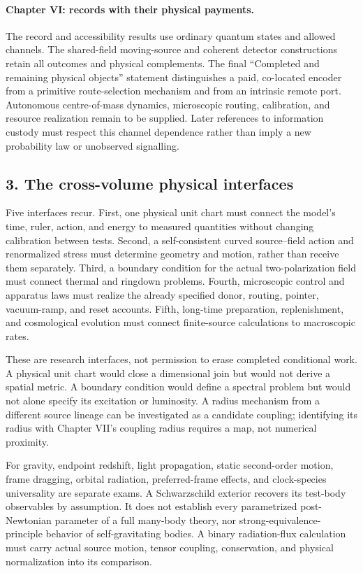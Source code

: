 \paragraph{Chapter VI: records with their physical payments.}
The record and accessibility results use ordinary quantum states and allowed channels. The shared-field moving-source and coherent detector constructions retain all outcomes and physical complements. The final ``Completed and remaining physical objects'' statement distinguishes a paid, co-located encoder from a primitive route-selection mechanism and from an intrinsic remote port. Autonomous centre-of-mass dynamics, microscopic routing, calibration, and resource realization remain to be supplied. Later references to information custody must respect this channel dependence rather than imply a new probability law or unobserved signalling.

\subsection*{3. The cross-volume physical interfaces}

Five interfaces recur. First, one physical unit chart must connect the model's time, ruler, action, and energy to measured quantities without changing calibration between tests. Second, a self-consistent curved source--field action and renormalized stress must determine geometry and motion, rather than receive them separately. Third, a boundary condition for the actual two-polarization field must connect thermal and ringdown problems. Fourth, microscopic control and apparatus laws must realize the already specified donor, routing, pointer, vacuum-ramp, and reset accounts. Fifth, long-time preparation, replenishment, and cosmological evolution must connect finite-source calculations to macroscopic rates.

These are research interfaces, not permission to erase completed conditional work. A physical unit chart would close a dimensional join but would not derive a spatial metric. A boundary condition would define a spectral problem but would not alone specify its excitation or luminosity. A radius mechanism from a different source lineage can be investigated as a candidate coupling; identifying its radius with Chapter VII's coupling radius requires a map, not numerical proximity.

For gravity, endpoint redshift, light propagation, static second-order motion, frame dragging, orbital radiation, preferred-frame effects, and clock-species universality are separate exams. A Schwarzschild exterior recovers its test-body observables by assumption. It does not establish every parametrized post-Newtonian parameter of a full many-body theory, nor strong-equivalence-principle behavior of self-gravitating bodies. A binary radiation-flux calculation must carry actual source motion, tensor coupling, conservation, and physical normalization into its comparison.

